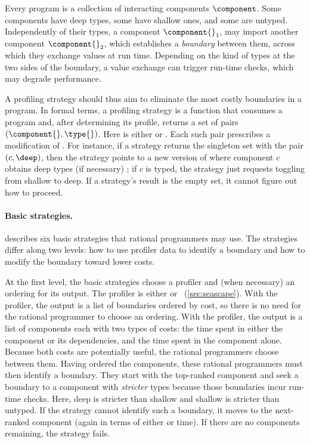 Every program \program{} is a collection of interacting components $\component$.
Some components have deep types, some have shallow ones, and some
are untyped. Independently of their types, a component $\component{}_1$, may
import another component $\component{}_2$, which establishes a \emph{boundary}
between them, across which they exchange values at run time. Depending on the
kind of types at the two sides of the boundary, a value exchange can trigger
run-time checks, which may degrade performance.

A profiling strategy should thus aim to eliminate the most costly
boundaries in a program. In formal terms, a profiling strategy is a
function that consumes a program \program{} and, after determining its
profile, returns a set of pairs $(\component{}, \type{})$. Here \type{} is
either \deep{} or \shallow{}. Each such pair prescribes a modification of
\program{}. For instance, if a strategy returns the singleton set with the
pair $(c, \deep)$, then the strategy points to a new version of \program{}
where component $c$ obtains deep types (if necessary) ; if $c$ is typed,
the strategy just requests toggling from shallow to deep.  If a strategy's
result is the empty set, it cannot figure out how to proceed.

\paragraph{Basic strategies.}   describes six basic
strategies that rational programmers may use.
The strategies differ along two levels: how to use profiler data to identify
a boundary and how to modify the boundary toward lower costs.

At the first level, the basic strategies choose a profiler and
(when necessary) an ordering for its output.
The profiler is either \featkw{} or \statkw{}~(\cref{sec:seascape}).
With the \boundary{} profiler, the output is a list of boundaries
ordered by cost, so there is no need for the rational programmer
to choose an ordering.
With the \statistical{} profiler, the output is a list of components
each with two types of costs: the \totalkw{} time spent in either the component
or its dependencies, and the \selfkw{} time spent in the component alone.
Because both costs are potentially useful, the rational programmers choose
between them.
Having ordered the components, these rational programmers must then identify a
boundary.
They start with the top-ranked component and seek a boundary to a component
with \emph{stricter} types because those boundaries incur run-time checks.
Here, deep is stricter than shallow and shallow is stricter than untyped.
If the strategy cannot identify such a boundary, it moves to the next-ranked
component (again in terms of either \selfkw{} or \totalkw{} time).
If there are no components remaining, the strategy fails.

